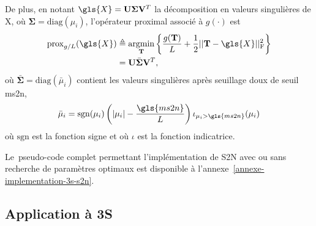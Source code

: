 De plus, en notant $\gls{X}=\mathbf{U}\boldsymbol{\Sigma} \mathbf{V}^T$ la décomposition en valeurs singulières de \gls{X}, où $\boldsymbol{\Sigma} = \mathrm{diag}(\mu_i)$, l'opérateur proximal associé à $g(\cdot)$ est~\cite{cai1956singular}
\begin{align}
    \mathrm{prox}_{g/L}(\gls{X}) &\triangleq \argmin_{\mathbf{T}} 
                                    \left\{ \frac{g(\mathbf{T})}{L} + \frac{1}{2}\frobnorm{\mathbf{T} - \gls{X}} \right\}\\
                               &= {\mathbf{U}} \bar{\boldsymbol{\Sigma}} {\mathbf{V}}^T, \label{prox-s2n}
\end{align}
où $\bar{\boldsymbol{\Sigma}} = \mathrm{diag}(\bar{\mu}_i)$ contient les valeurs singulières après seuillage doux de seuil \gls{ms2n}, \ie{}
\begin{equation}
    \bar{\mu}_i = \mathrm{sgn}(\mu_i)\left(|\mu_i|-\frac{\gls{ms2n}}{L}\right)\iota_{\mu_i>\gls{ms2n}}(\mu_i)
\end{equation}
où $\mathrm{sgn}$ est la fonction signe et où $\iota$ est la fonction indicatrice.

Le pseudo-code complet permettant l'implémentation de S2N avec ou sans recherche de paramètres optimaux est disponible à l'annexe~\ref{annexe-implementation-3s-s2n}.


\subsection{Application à 3S}\label{subsec-implementation-3s}

